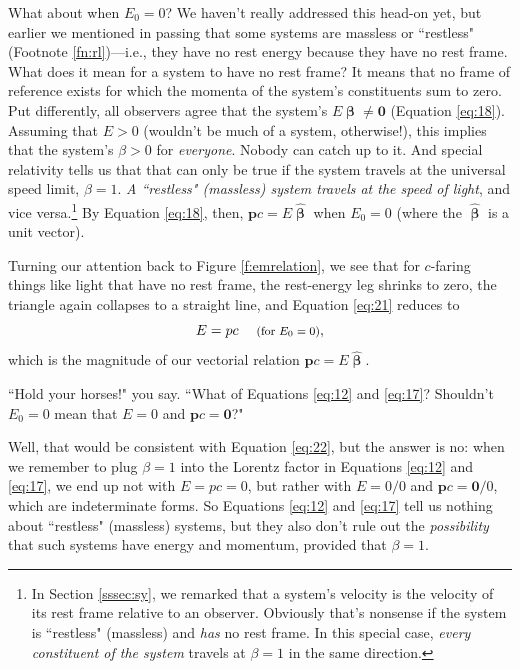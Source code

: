 \documentclass[12pt]{article}
\renewcommand{\vv}[1]{\mathbf{#1}}
\newcommand{\vvbeta}{\bm{\upbeta}}
\newcommand{\hatbeta}{\bm{\hat{\upbeta}}}
\begin{document}
What about when $E_0 = 0$? We haven't really addressed this head-on yet, but earlier we mentioned in passing that some systems are massless or ``restless" (Footnote \ref{fn:rl})---i.e., they have no rest energy because they have no rest frame. What does it mean for a system to have no rest frame? It means that no frame of reference exists for which the momenta of the system's constituents sum to zero. Put differently, all observers agree that the system's $E \vvbeta \neq \vv 0$ (Equation \ref{eq:18}). Assuming that $E > 0$ (wouldn't be much of a system, otherwise!), this implies that the system's $\beta > 0$ for \emph{everyone}. Nobody can catch up to it. And special relativity tells us that that can only be true if the system travels at the universal speed limit, $\beta = 1$. \emph{A ``restless" (massless) system travels at the speed of light}, and vice versa.\footnote{In Section \ref{sssec:sy}, we remarked that a system's velocity is the velocity of its rest frame relative to an observer. Obviously that's nonsense if the system is ``restless" (massless) and \emph{has} no rest frame. In this special case, \emph{every constituent of the system} travels at $\beta = 1$ in the same direction.} By Equation \ref{eq:18}, then, $\vv p c = E \hatbeta$ when $E_0 = 0$ (where the $\hatbeta$ is a unit vector).

Turning our attention back to Figure \ref{f:emrelation}, we see that for $c$-faring things like light that have no rest frame, the rest-energy leg shrinks to zero, the triangle again collapses to a straight line, and Equation \ref{eq:21} reduces to
\begin{equation}\label{eq:22}
E=p c \quad \textrm{\footnotesize{ (for $E_0=0$)}},
\end{equation}
which is the magnitude of our vectorial relation $\vv p c = E \hatbeta$.

``Hold your horses!" you say. ``What of Equations \ref{eq:12} and \ref{eq:17}? Shouldn't $E_0 = 0$ mean that $E = 0$ and $\vv p c = \vv 0$?"

Well, that would be consistent with Equation \ref{eq:22}, but the answer is no: when we remember to plug $\beta = 1$ into the Lorentz factor in Equations \ref{eq:12} and \ref{eq:17}, we end up not with $E = p c = 0$, but rather with $E = 0/0$ and $\vv p c = \vv 0 / 0$, which are indeterminate forms. So Equations \ref{eq:12} and \ref{eq:17} tell us nothing about ``restless" (massless) systems, but they also don't rule out the \emph{possibility} that such systems have energy and momentum, provided that $\beta = 1$.
\end{document}
